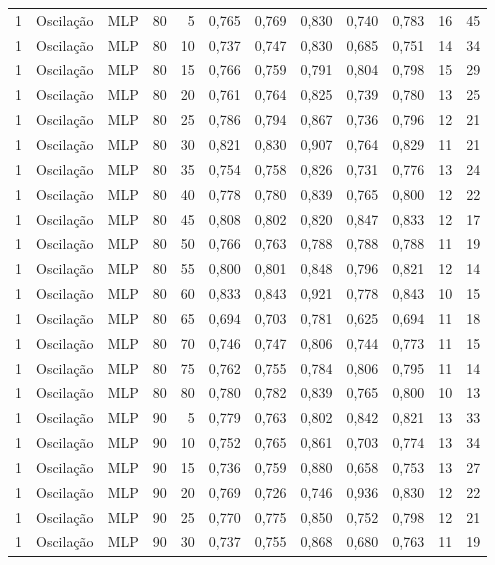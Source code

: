 \begin{longtable}{@{}rllrrrrrrrrr@{}}
1 & Oscilação & MLP & 80 & 5 & 0,765 & 0,769 & 0,830 & 0,740 & 0,783 & 16 & 45 \\
1 & Oscilação & MLP & 80 & 10 & 0,737 & 0,747 & 0,830 & 0,685 & 0,751 & 14 & 34 \\
1 & Oscilação & MLP & 80 & 15 & 0,766 & 0,759 & 0,791 & 0,804 & 0,798 & 15 & 29 \\
1 & Oscilação & MLP & 80 & 20 & 0,761 & 0,764 & 0,825 & 0,739 & 0,780 & 13 & 25 \\
1 & Oscilação & MLP & 80 & 25 & 0,786 & 0,794 & 0,867 & 0,736 & 0,796 & 12 & 21 \\
1 & Oscilação & MLP & 80 & 30 & 0,821 & 0,830 & 0,907 & 0,764 & 0,829 & 11 & 21 \\
1 & Oscilação & MLP & 80 & 35 & 0,754 & 0,758 & 0,826 & 0,731 & 0,776 & 13 & 24 \\
1 & Oscilação & MLP & 80 & 40 & 0,778 & 0,780 & 0,839 & 0,765 & 0,800 & 12 & 22 \\
1 & Oscilação & MLP & 80 & 45 & 0,808 & 0,802 & 0,820 & 0,847 & 0,833 & 12 & 17 \\
1 & Oscilação & MLP & 80 & 50 & 0,766 & 0,763 & 0,788 & 0,788 & 0,788 & 11 & 19 \\
1 & Oscilação & MLP & 80 & 55 & 0,800 & 0,801 & 0,848 & 0,796 & 0,821 & 12 & 14 \\
1 & Oscilação & MLP & 80 & 60 & 0,833 & 0,843 & 0,921 & 0,778 & 0,843 & 10 & 15 \\
1 & Oscilação & MLP & 80 & 65 & 0,694 & 0,703 & 0,781 & 0,625 & 0,694 & 11 & 18 \\
1 & Oscilação & MLP & 80 & 70 & 0,746 & 0,747 & 0,806 & 0,744 & 0,773 & 11 & 15 \\
1 & Oscilação & MLP & 80 & 75 & 0,762 & 0,755 & 0,784 & 0,806 & 0,795 & 11 & 14 \\
1 & Oscilação & MLP & 80 & 80 & 0,780 & 0,782 & 0,839 & 0,765 & 0,800 & 10 & 13 \\
1 & Oscilação & MLP & 90 & 5 & 0,779 & 0,763 & 0,802 & 0,842 & 0,821 & 13 & 33 \\
1 & Oscilação & MLP & 90 & 10 & 0,752 & 0,765 & 0,861 & 0,703 & 0,774 & 13 & 34 \\
1 & Oscilação & MLP & 90 & 15 & 0,736 & 0,759 & 0,880 & 0,658 & 0,753 & 13 & 27 \\
1 & Oscilação & MLP & 90 & 20 & 0,769 & 0,726 & 0,746 & 0,936 & 0,830 & 12 & 22 \\
1 & Oscilação & MLP & 90 & 25 & 0,770 & 0,775 & 0,850 & 0,752 & 0,798 & 12 & 21 \\
1 & Oscilação & MLP & 90 & 30 & 0,737 & 0,755 & 0,868 & 0,680 & 0,763 & 11 & 19 \\

\end{longtable}
